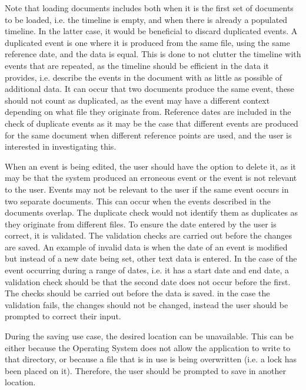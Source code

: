 \par Note that loading documents includes both when it is the first set of documents to be loaded, i.e. the timeline is empty, and when there is already a populated timeline. In the latter case, it would be beneficial to discard duplicated events. A duplicated event is one where it is produced from the same file, using the same reference date, and the data is equal. This is done to not clutter the timeline with events that are repeated, as the timeline should be efficient in the data it provides, i.e. describe the events in the document with as little as possible of additional data. It can occur that two documents produce the same event, these should not count as duplicated, as the event may have a different context depending on what file they originate from. Reference dates are included in the check of duplicate events as it may be the case that different events are produced for the same document when different reference points are used, and the user is interested in investigating this. 

\par When an event is being edited, the user should have the option to delete it, as it may be that the system produced an erroneous event or the event is not relevant to the user. Events may not be relevant to the user if the same event occurs in two separate documents. This can occur when the events described in the documents overlap. The duplicate check would not identify them as duplicates as they originate from different files. To ensure the date entered by the user is correct, it is validated. The validation checks are carried out before the changes are saved. An example of invalid data is when the date of an event is modified but instead of a new date being set, other text data is entered. In the case of the event occurring during a range of dates, i.e. it has a start date and end date, a validation check should be that the second date does not occur before the first. The checks should be carried out before the data is saved. in the case the validation fails, the changes should not be changed, instead the user should be prompted to correct their input.
\par During the saving use case, the desired location can be unavailable. This can be either because the Operating System does not allow the application to write to that directory, or because a file that is in use is being overwritten (i.e. a lock has been placed on it). Therefore, the user should be prompted to save in another location.

